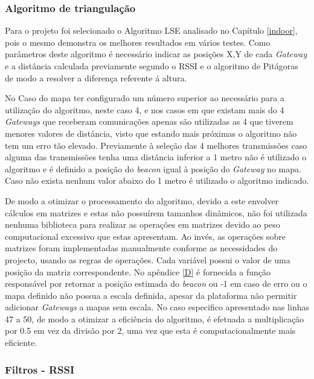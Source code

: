 \subsubsection{Algoritmo de triangulação}

\par Para o projeto foi selecionado o Algoritmo LSE analisado no Capítulo \ref{indoor}, pois o mesmo demonstra os melhores resultados em vários testes. Como parâmetros deste algoritmo é necessário indicar as posições X,Y de cada \textit{Gateway} e a distância calculada previamente segundo o RSSI e o algoritmo de Pitágoras de modo a resolver a diferença referente á altura.

\par No Caso do mapa ter configurado um número superior ao necessário para a utilização do algoritmo, neste caso 4, e nos casos em que existam mais do 4 \textit{Gateways} que receberam comunicações apenas são utilizadas as 4 que tiverem menores valores de distância, visto que estando mais próximas o algoritmo não tem um erro tão elevado. Previamente à seleção das 4 melhores transmissões caso alguma das transmissões tenha uma distância inferior a 1 metro não é utilizado o algoritmo e é definido a posição do \textit{beacon} igual à posição do \textit{Gateway} no mapa. Caso não exista nenhum valor abaixo do 1 metro é utilizado o algoritmo indicado.
 
\par De modo a otimizar o processamento do algoritmo, devido a este envolver cálculos em matrizes e estas não possuírem tamanhos dinâmicos, não foi utilizada nenhuma biblioteca para realizar as operações em matrizes devido ao peso computacional excessivo que estas apresentam. Ao invés, as operações sobre matrizes foram implementadas manualmente conforme as  necessidades do projecto, usando as regras de operações. Cada variável possui o valor de uma posição da matriz correspondente. No apêndice \ref{D} é fornecida a função responsável por retornar a posição estimada do \textit{beacon} ou -1 em caso de erro ou o mapa definido não possua a escala definida, apesar da plataforma não permitir adicionar \textit{Gateways} a mapas sem escala. No caso especifico apresentado nas linhas 47 a 50, de modo a otimizar a eficiência do algoritmo, é efetuada a multiplicação por 0.5 em vez da divisão por 2, uma vez que esta é computacionalmente mais eficiente.
\subsubsection{Filtros - RSSI}

